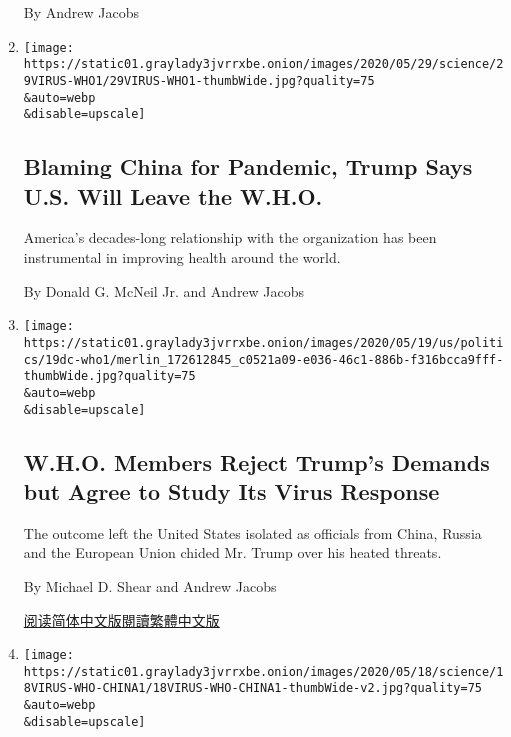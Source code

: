 \begin{enumerate}
  By Andrew Jacobs
\item
  \href{/2020/05/29/health/virus-who.html}{}

  \texttt{[image: https://static01.graylady3jvrrxbe.onion/images/2020/05/29/science/29VIRUS-WHO1/29VIRUS-WHO1-thumbWide.jpg?quality=75\\\&auto=webp\\\&disable=upscale]}

  \hypertarget{blaming-china-for-pandemic-trump-says-us-will-leave-the-who}{%
  \subsection{Blaming China for Pandemic, Trump Says U.S. Will Leave the
  W.H.O.}\label{blaming-china-for-pandemic-trump-says-us-will-leave-the-who}}

  America's decades-long relationship with the organization has been
  instrumental in improving health around the world.

  By Donald G. McNeil Jr. and Andrew Jacobs
\item
  \href{/2020/05/19/us/politics/trump-who-coronavirus.html}{}

  \texttt{[image: https://static01.graylady3jvrrxbe.onion/images/2020/05/19/us/politics/19dc-who1/merlin\_172612845\_c0521a09-e036-46c1-886b-f316bcca9fff-thumbWide.jpg?quality=75\\\&auto=webp\\\&disable=upscale]}

  \hypertarget{who-members-reject-trumps-demands-but-agree-to-study-its-virus-response}{%
  \subsection{W.H.O. Members Reject Trump's Demands but Agree to Study
  Its Virus
  Response}\label{who-members-reject-trumps-demands-but-agree-to-study-its-virus-response}}

  The outcome left the United States isolated as officials from China,
  Russia and the European Union chided Mr. Trump over his heated
  threats.

  By Michael D. Shear and Andrew Jacobs

  \href{https://cn.nytimes3xbfgragh.onion/usa/20200520/trump-who-coronavirus/}{阅读简体中文版}\href{https://cn.nytimes3xbfgragh.onion/usa/20200520/trump-who-coronavirus/zh-hant/}{閱讀繁體中文版}
\item
  \href{/2020/05/18/health/coronavirus-who-china-trump.html}{}

  \texttt{[image: https://static01.graylady3jvrrxbe.onion/images/2020/05/18/science/18VIRUS-WHO-CHINA1/18VIRUS-WHO-CHINA1-thumbWide-v2.jpg?quality=75\\\&auto=webp\\\&disable=upscale]}


\end{enumerate}
